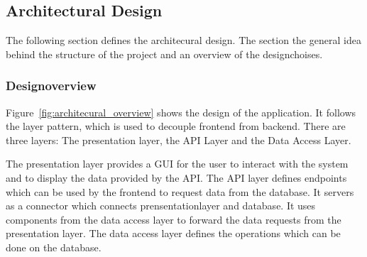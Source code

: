 \subsection{Architectural Design}\label{sec:architectural_design}
The following section defines the architecural design. The section the general idea behind the structure of the project and an
overview of the designchoises.

\subsubsection{Designoverview}

Figure~\ref{fig:architecural_overview} shows the design of the application. It follows the layer pattern,
which is used to decouple frontend from backend. There are three layers: The presentation layer, the API Layer and
the Data Access Layer. 

The presentation layer provides a GUI for the user to interact with the system and to display the data provided by the API.
The API layer defines endpoints which can be used by the frontend to request data from the database. It servers as a connector
which connects prensentationlayer and database. It uses components from the data access layer to forward the data requests from
the presentation layer. The data access layer defines the operations which can be done on the database.

